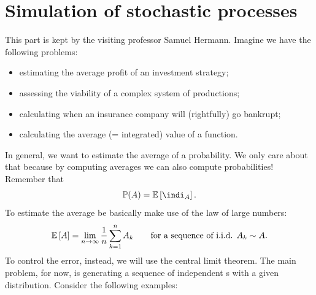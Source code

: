 \documentclass[12pt]{report}
\begin{document}
\chapter{Simulation of stochastic processes}
This part is kept by the visiting professor Samuel Hermann.
Imagine we have the following problems:
\begin{itemize}
	\item estimating the average profit of an investment strategy;
	\item assessing the viability of a complex system of productions;
	\item calculating when an insurance company will (rightfully) go bankrupt;
	\item calculating the average (= integrated) value of a function.
\end{itemize}
In general, we want to estimate the average of a probability. We only care about that because by computing averages we can also compute probabilities! Remember that
\begin{equation*}
	\pr(A)=\ev{\indi_{A}}.
\end{equation*}
To estimate the average be basically make use of the law of large numbers:
\begin{equation*}
	\mathbb{E}\left[A\right]=\lim_{n \to \infty}\frac{1}{n}\sum_{k=1}^{n}A_{k}\qquad\text{for a sequence of i.i.d. }A_{k}\sim A.
\end{equation*}
To control the error, instead, we will use the central limit theorem. The main problem, for now, is generating a sequence of independent \rv s with a given distribution. Consider the following examples:
\end{document}
